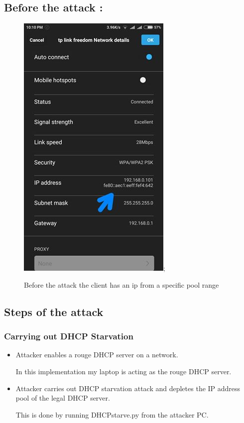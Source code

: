 \documentclass[12pt]{article}
\begin{document}
\begin{sloppypar}
\begin{sloppypar}
\end{sloppypar}

\subsection{Before the attack : }

\begin{figure}[h]
    \centering
    \includegraphics[width=7 cm,height=10 cm]{images/normal_conn.png};
    \caption{Before the attack the client has an ip from a specific pool range}
    \end{figure}


\newpage
\subsection{Steps of the attack}
\subsubsection{Carrying out DHCP Starvation}
\begin{itemize}
     \item Attacker enables a rouge DHCP server on a network.
     
    In this implementation my laptop is acting as the rouge DHCP server.
    
    \item Attacker carries out DHCP starvation attack and depletes the IP address pool of the legal DHCP server.
    
    This is done by running DHCPstarve.py from the attacker PC.
    

\end{itemize}
\end{sloppypar}
\end{document}
